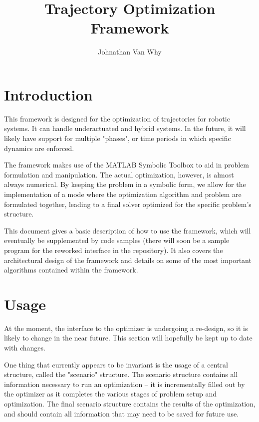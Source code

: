 \documentclass{article}
\title{Trajectory Optimization Framework}
\author{Johnathan Van Why}
\begin{document}
	\maketitle
	\section{Introduction}
		This framework is designed for the optimization of trajectories for robotic systems.
		It can handle underactuated and hybrid systems. In the future, it will likely have support for multiple
		"phases", or time periods in which specific dynamics are enforced.

		The framework makes use of the MATLAB Symbolic Toolbox to aid in problem formulation and manipulation.
		The actual optimization, however, is almost always numerical. By keeping the problem in a symbolic form, we
		allow for the implementation of a mode where the optimization algorithm and problem are formulated together, leading
		to a final solver optimized for the specific problem's structure.

		This document gives a basic description of how to use the framework, which
		will eventually be supplemented by code samples (there will soon be a sample program
		for the reworked interface in the repository). It also covers the architectural design of the framework
		and details on some of the most important algorithms contained within the framework.

	\section{Usage}
		At the moment, the interface to the optimizer is undergoing a re-design, so it is likely to change in the near future.
		This section will hopefully be kept up to date with changes.

		One thing that currently appears to be invariant is the usage of a central structure, called the "scenario" structure.
		The scenario structure contains all information necessary to run an optimization -- it is incrementally filled out by the optimizer
		as it completes the various stages of problem setup and optimization. The final scenario structure contains the results of the optimization,
		and should contain all information that may need to be saved for future use.
\end{document}
